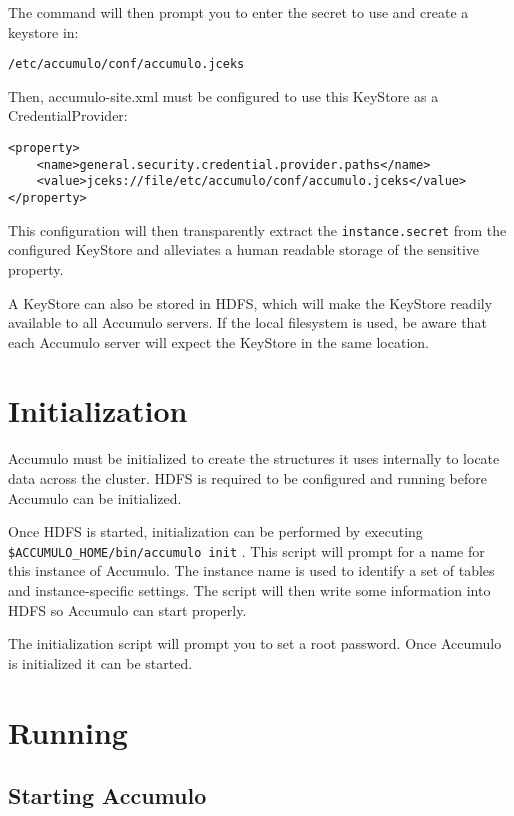 The command will then prompt you to enter the secret to use and create a keystore in: 

\begingroup\fontsize{8pt}{8pt}\selectfont\begin{verbatim}
/etc/accumulo/conf/accumulo.jceks
\end{verbatim}\endgroup

Then, accumulo-site.xml must be configured to use this KeyStore as a CredentialProvider:

\begingroup\fontsize{8pt}{8pt}\selectfont\begin{verbatim}
<property>
    <name>general.security.credential.provider.paths</name>
    <value>jceks://file/etc/accumulo/conf/accumulo.jceks</value>
</property>
\end{verbatim}\endgroup

This configuration will then transparently extract the \texttt{instance.secret} from
the configured KeyStore and alleviates a human readable storage of the sensitive
property.

A KeyStore can also be stored in HDFS, which will make the KeyStore readily available to
all Accumulo servers. If the local filesystem is used, be aware that each Accumulo server
will expect the KeyStore in the same location.

\section{Initialization}

Accumulo must be initialized to create the structures it uses internally to locate
data across the cluster. HDFS is required to be configured and running before
Accumulo can be initialized.

Once HDFS is started, initialization can be performed by executing\\
\texttt{\$ACCUMULO\_HOME/bin/accumulo init} . This script will prompt for a name
for this instance of Accumulo. The instance name is used to identify a set of tables
and instance-specific settings. The script will then write some information into
HDFS so Accumulo can start properly.

The initialization script will prompt you to set a root password. Once Accumulo is
initialized it can be started.

\section{Running}

\subsection{Starting Accumulo}

